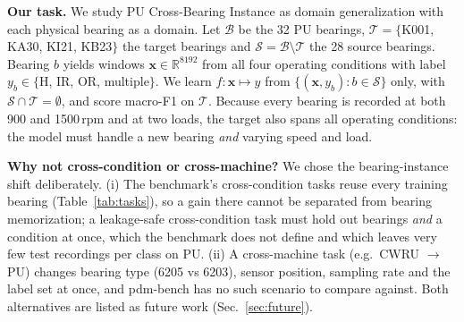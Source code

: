 \documentclass[conference]{IEEEtran}
\newcommand{\mF}{macro-F1}
\begin{document}
\begin{table}[t]
\centering
\caption{The six pdm-bench tasks \cite{knap2026} and our bearing-level audit}
\label{tab:tasks}
\setlength{\tabcolsep}{2.5pt}
\end{table}

\textbf{Our task.} We study PU Cross-Bearing Instance as domain generalization with each
physical bearing as a domain. Let $\mathcal{B}$ be the 32 PU bearings, $\mathcal{T}=\{$K001,
KA30, KI21, KB23$\}$ the target bearings and $\mathcal{S}=\mathcal{B}\setminus\mathcal{T}$ the 28
source bearings. Bearing $b$ yields windows $\mathbf{x}\in\mathbb{R}^{8192}$ from all four
operating conditions with label $y_b\in\{$H, IR, OR, multiple$\}$. We learn
$f:\mathbf{x}\mapsto y$ from $\{(\mathbf{x},y_b): b\in\mathcal{S}\}$ only, with
$\mathcal{S}\cap\mathcal{T}=\emptyset$, and score \mF{} on $\mathcal{T}$. Because every
bearing is recorded at both 900 and 1500\,rpm and at two loads, the target also spans all
operating conditions: the model must handle a new bearing \emph{and} varying speed and load.

\textbf{Why not cross-condition or cross-machine?} We chose the bearing-instance shift
deliberately. (i) The benchmark's cross-condition tasks reuse every training bearing
(Table~\ref{tab:tasks}), so a gain there cannot be separated from bearing memorization; a
leakage-safe cross-condition task must hold out bearings \emph{and} a condition at once, which
the benchmark does not define and which leaves very few test recordings per class on PU.
(ii) A cross-machine task (e.g.\ CWRU $\rightarrow$ PU) changes bearing type (6205 vs 6203),
sensor position, sampling rate and the label set at once, and pdm-bench has no such scenario
to compare against. Both alternatives are listed as future
work (Sec.~\ref{sec:future}).
\end{document}
